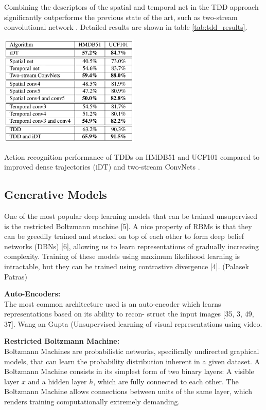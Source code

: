 Combining the descriptors of the spatial and temporal net in the TDD approach significantly outperforms the previous state of the art, such as two-stream convolutional network \cite{simonyan_two-stream_2014}.
Detailed results are shown in table \ref{tab:tdd_results}.

\begin{table}[H]
    \centering
    \includegraphics[width=0.5\textwidth]{img_deep/tdd_results}
    \caption{Action recognition performance of TDDs on HMDB51 and UCF101 compared to improved dense trajectories (iDT) \cite{wang_action_2013} and two-stream ConvNets \cite{simonyan_two-stream_2014}. \cite{wang_action_2015}}
    \label{tab:tdd_results}
\end{table}


\subsection{Generative Models}
\label{sec:generative}

One of the most popular deep learning models that can be trained unsupervised is the restricted Boltzmann machine [5]. A nice property of RBMs is that they can be greedily trained and stacked on top of each other to form deep belief networks (DBNs) [6], allowing us to learn representations of gradually increasing complexity. Training of these models using maximum likelihood learning is intractable, but they can be trained using contrastive divergence [4]. (Palasek Patras)

\textbf{Auto-Encoders:}\\
The most common architecture used is an auto-encoder
which learns representations based on its ability to recon-
struct the input images [35, 3, 49, 37]. Wang an Gupta (Unsupervised learning of visual representations using video.

\textbf{Restricted Boltzmann Machine:}\\
Boltzmann Machines are probabilistic networks, specifically undirected graphical models, that can learn the probability distribution inherent in a given dataset.
A Boltzmann Machine consists in its simplest form of two binary layers: A visible layer $x$ and a hidden layer $h$, which are fully connected to each other.
The Boltzmann Machine allows connections between units of the same layer, which renders training computationally extremely demanding.


